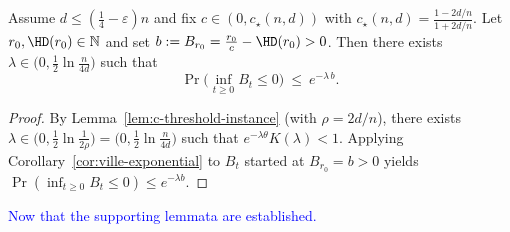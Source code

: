 \begin{lemma}
	\label{lem:param-constant-c-general}
	Assume $d\le(\tfrac14-\varepsilon)n$ and fix $c\in(0,c_\star(n,d))$ with 
	$c_\star(n,d)=\frac{1-2d/n}{1+2d/n}$.
	Let $r_0,\HD(r_0)\in\mathbb{N}$ and set $b:=B_{r_0}=\frac{r_0}{c}-\HD(r_0)>0$.
	Then there exists $\lambda\in\big(0,\tfrac12\ln\frac{n}{4d}\big)$ such that
	\[
	\Pr\!\big(\inf_{t\ge 0} B_t \le 0\big)\ \le\ e^{-\lambda\,b}.
	\]
\end{lemma}
\begin{proof}
	By Lemma~\ref{lem:c-threshold-instance} (with $\rho=2d/n$), there exists
	$\lambda\in\big(0,\tfrac12\ln\tfrac{1}{2\rho}\big)=\big(0,\tfrac12\ln\tfrac{n}{4d}\big)$
	such that $e^{-\lambda\theta}K(\lambda)<1$. Applying Corollary~\ref{cor:ville-exponential}
	to $B_t$ started at $B_{r_0}=b>0$ yields
	$\Pr(\inf_{t\ge 0} B_t\le 0)\le e^{-\lambda b}$.
\end{proof}

\textcolor{blue}{Now that the supporting lemmata are established.}

